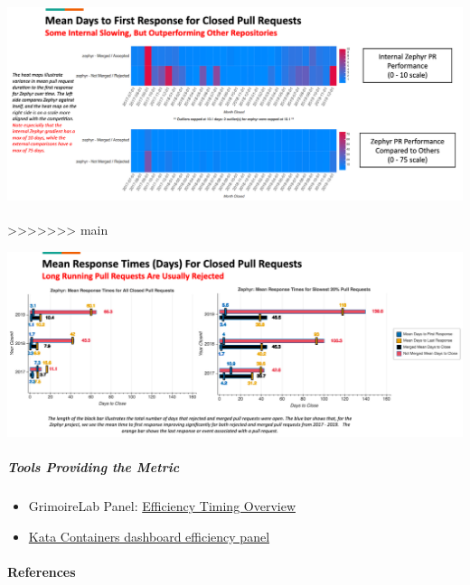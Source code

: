 \hypertarget{augur-visualization-time-to-first-response-heat-map-}{%
\subsection{\texorpdfstring{\protect\includegraphics{images/time-to-first-response_augur-ttc-1.png}}{Augur Visualization: Time to First Response Heat Map }}\label{augur-visualization-time-to-first-response-heat-map-}}
>>>>>>> main

\includegraphics{images/time-to-first-response_augur-ttc-2.png}

\hypertarget{tools-providing-the-metric}{%
\subparagraph{Tools Providing the
Metric}\label{tools-providing-the-metric}}

\begin{itemize}
\tightlist
\item
  GrimoireLab Panel:
  \href{https://chaoss.github.io/grimoirelab-sigils/panels/efficiency-timing-overview/}{Efficiency
  Timing Overview}
\item
  \href{https://katacontainers.biterg.io/app/kibana\#/dashboard/cbbdd920-288c-11e9-b662-975152e57997}{Kata
  Containers dashboard efficiency panel}
\end{itemize}

\hypertarget{references}{%
\paragraph{References}\label{references}}
